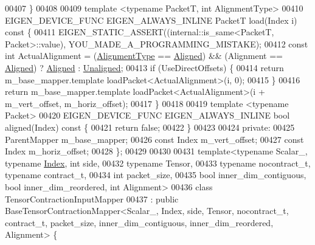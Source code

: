 \begin{DoxyCode}
00407   \}
00408 
00409   \textcolor{keyword}{template} <\textcolor{keyword}{typename} PacketT, \textcolor{keywordtype}{int} AlignmentType>
00410   EIGEN\_DEVICE\_FUNC EIGEN\_ALWAYS\_INLINE PacketT load(Index i)\textcolor{keyword}{ const }\{
00411     EIGEN\_STATIC\_ASSERT((internal::is\_same<PacketT, Packet>::value), YOU\_MADE\_A\_PROGRAMMING\_MISTAKE);
00412     \textcolor{keyword}{const} \textcolor{keywordtype}{int} ActualAlignment = (\hyperlink{group__enums_ga45fe06e29902b7a2773de05ba27b47a1}{AlignmentType} == \hyperlink{group__enums_gga45fe06e29902b7a2773de05ba27b47a1ad37d4c71425bb286e9b4103830538fbf}{Aligned}) && (Alignment == 
      \hyperlink{group__enums_gga45fe06e29902b7a2773de05ba27b47a1ad37d4c71425bb286e9b4103830538fbf}{Aligned}) ? \hyperlink{group__enums_gga45fe06e29902b7a2773de05ba27b47a1ad37d4c71425bb286e9b4103830538fbf}{Aligned} : \hyperlink{group__enums_gga45fe06e29902b7a2773de05ba27b47a1ac935220b4c844108e183ebe30a4d5204}{Unaligned};
00413     \textcolor{keywordflow}{if} (UseDirectOffsets) \{
00414      \textcolor{keywordflow}{return} m\_base\_mapper.template loadPacket<ActualAlignment>(i, 0);
00415     \}
00416     \textcolor{keywordflow}{return} m\_base\_mapper.template loadPacket<ActualAlignment>(i + m\_vert\_offset, m\_horiz\_offset);
00417   \}
00418 
00419   \textcolor{keyword}{template} <\textcolor{keyword}{typename} Packet>
00420   EIGEN\_DEVICE\_FUNC EIGEN\_ALWAYS\_INLINE \textcolor{keywordtype}{bool} aligned(Index)\textcolor{keyword}{ const }\{
00421     \textcolor{keywordflow}{return} \textcolor{keyword}{false};
00422   \}
00423 
00424  \textcolor{keyword}{private}:
00425   ParentMapper m\_base\_mapper;
00426   \textcolor{keyword}{const} Index m\_vert\_offset;
00427   \textcolor{keyword}{const} Index m\_horiz\_offset;
00428 \};
00429 
00430 
00431 \textcolor{keyword}{template}<\textcolor{keyword}{typename} Scalar\_, \textcolor{keyword}{typename} \hyperlink{namespace_eigen_a62e77e0933482dafde8fe197d9a2cfde}{Index}, \textcolor{keywordtype}{int} side,
00432          \textcolor{keyword}{typename} Tensor,
00433          \textcolor{keyword}{typename} nocontract\_t, \textcolor{keyword}{typename} contract\_t,
00434          \textcolor{keywordtype}{int} packet\_size,
00435          \textcolor{keywordtype}{bool} inner\_dim\_contiguous, \textcolor{keywordtype}{bool} inner\_dim\_reordered, \textcolor{keywordtype}{int} Alignment>
00436 \textcolor{keyword}{class }TensorContractionInputMapper
00437   : \textcolor{keyword}{public} BaseTensorContractionMapper<Scalar\_, Index, side, Tensor, nocontract\_t, contract\_t, packet\_size,
       inner\_dim\_contiguous, inner\_dim\_reordered, Alignment> \{

\end{DoxyCode}
